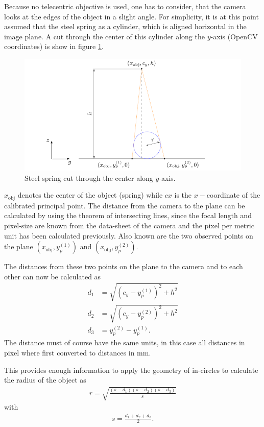 Because no telecentric objective is used, one has to consider, that the camera looks at the edges of the object in a slight angle.
For simplicity, it is at this point assumed that the steel spring as a cylinder, which is aligned horizontal in the image plane.
A cut through the center of this cylinder along the $y$-axis (OpenCV coordinates) is show in figure \ref{development:diameter}.
\begin{figure}[ht]
	\centering
	\includegraphics[width=0.9\linewidth]{3-development/software/images/diameter_estimation.pdf}
	\caption{Steel spring cut through the center along $y$-axis.\label{development:diameter}}
\end{figure}
$x_{\text{obj}}$ denotes the center of the object (spring) while $cx$ is the $x-$coordinate of the calibrated principal point.
The distance from the camera to the plane can be calculated by using the theorem of intersecting lines, since the focal length and pixel-size are known from the data-sheet of the camera and the pixel per metric unit has been calculated previously.
Also known are the two observed points on the plane $(x_{\text{obj}}, y_p^{(1)})$ and $(x_{\text{obj}}, y_p^{(2)})$.

The distances from these two points on the plane to the camera and to each other can now be calculated as
\begin{align*}
	d_{1}&=\sqrt{(c_y-y_p^{(1)})^2+h^2}\\
	d_{2}&=\sqrt{(c_y-y_p^{(2)})^2+h^2}\\
	d_{3}&=y_p^{(2)}-y_p^{(1)}.
\end{align*}
The distance must of course have the same units, in this case all distances in pixel where first converted to distances in mm.

This provides enough information to apply the geometry of in-circles \cite{incircles} to calculate the radius of the object as
\begin{align*}
	r=\sqrt{\frac{(s-d_1)(s-d_2)(s-d_3)}{s}}
\end{align*}
with
\begin{align*}
	s=\frac{d_1+d_2+d_3}{2}.
\end{align*}

